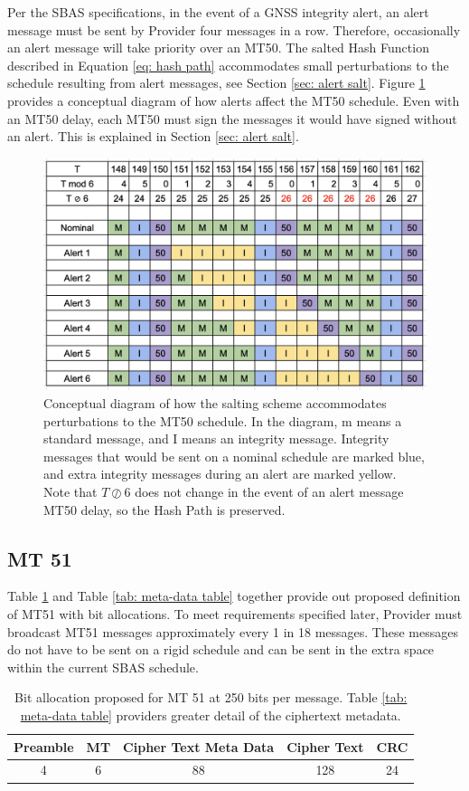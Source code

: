 \documentclass[letterpaper,times]{IONconf/IONconf}
\begin{document}
Per the SBAS specifications, in the event of a GNSS integrity alert, an alert message must be sent by Provider four messages in a row.
Therefore,  occasionally an alert message will take priority over an MT50.
The salted Hash Function described in Equation \eqref{eq: hash path} accommodates small perturbations to the schedule resulting from alert messages, see Section \ref{sec: alert salt}.
Figure \ref{fig: alert schedule} provides a conceptual diagram of how alerts affect the MT50 schedule.
Even with an MT50 delay, each MT50 must sign the messages it would have signed without an alert.
This is explained in Section \ref{sec: alert salt}.

\begin{figure}
\centering
\includegraphics[width=0.5\linewidth]{fig/alertschedule.png}
\caption{Conceptual diagram of how the salting scheme accommodates perturbations to the MT50 schedule. In the diagram, m means a standard message, and I means an integrity message. Integrity messages that would be sent on a nominal schedule are marked blue, and extra integrity messages during an alert are marked yellow. Note that $T \oslash 6$ does not change in the event of an alert message MT50 delay, so the Hash Path is preserved.}
\label{fig: alert schedule}
\end{figure}

\subsection{MT 51}
Table \ref{tab: high-level table} and Table \ref{tab: meta-data table} together provide out proposed definition of MT51 with bit allocations.
To meet requirements specified later, Provider must broadcast MT51 messages approximately every 1 in 18 messages.
These messages do not have to be sent on a rigid schedule and can be sent in the extra space within the current SBAS schedule.

\begin{table}[H]
\center
\begin{tabular}{|c|c|c|c|c|} \hline
	Preamble & MT & Cipher Text Meta Data & Cipher Text & CRC \\ \hline
	4 & 6 & 88 & 128 & 24 \\ \hline
\end{tabular}
\caption{Bit allocation proposed for MT 51 at 250 bits per message. Table \ref{tab: meta-data table} providers greater detail of the ciphertext metadata.}
\label{tab: high-level table}
\end{table}
\end{document}
